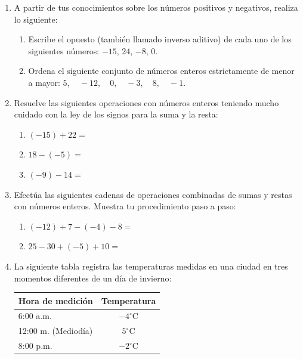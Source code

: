 \documentclass[12pt, letterpaper]{article}
\begin{document}
	\begin{enumerate}[itemsep=0.8cm]
		
		\item A partir de tus conocimientos sobre los números positivos y negativos, realiza lo siguiente:
		\begin{enumerate}[label=\alph*., itemsep=0.3cm, topsep=0.2cm]
			\item Escribe el opuesto (también llamado inverso aditivo) de cada uno de los siguientes números: $-15$, $24$, $-8$, $0$.
			\item Ordena el siguiente conjunto de números enteros estrictamente de menor a mayor: $5, \quad -12, \quad 0, \quad -3, \quad 8, \quad -1$.
		\end{enumerate}
		
		\item Resuelve las siguientes operaciones con números enteros teniendo mucho cuidado con la ley de los signos para la suma y la resta:
		\begin{enumerate}[label=\alph*., itemsep=0.3cm, topsep=0.2cm]
			\item $(-15) + 22 =$
			\item $18 - (-5) =$
			\item $(-9) - 14 =$
		\end{enumerate}
		
		\item Efectúa las siguientes cadenas de operaciones combinadas de sumas y restas con números enteros. Muestra tu procedimiento paso a paso:
		\begin{enumerate}[label=\alph*., itemsep=0.3cm, topsep=0.2cm]
			\item $(-12) + 7 - (-4) - 8 =$
			\item $25 - 30 + (-5) + 10 =$
		\end{enumerate}
		
		\item La siguiente tabla registra las temperaturas medidas en una ciudad en tres momentos diferentes de un día de invierno:
		
		\begin{table}[h]
			\centering
			\begin{tabular}{lc}
				\toprule
				\textbf{Hora de medición} & \textbf{Temperatura} \\
				\midrule
				6:00 a.m. & $-4^{\circ}\text{C}$ \\
				12:00 m. (Mediodía) & $5^{\circ}\text{C}$ \\
				8:00 p.m. & $-2^{\circ}\text{C}$ \\
				\bottomrule
			\end{tabular}
		\end{table}
		

\end{enumerate}
\end{document}
